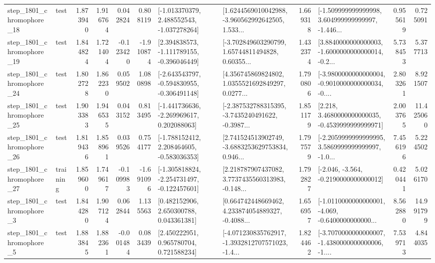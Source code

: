 \begin{tabular}{llrrrrllrlrr}
 step\_1801\_chromophore\_18 &      test &      1.873940 &    1.916764 &      0.042824 &  0.808119 &   [-1.013370379, 2.488552543, -1.037278264] &  [1.6244569010042988, -3.960562992642505, 1.533... &       1.669318 &  [-1.509999999999998, 3.604999999999997, -1.446... &            0.955619 &          0.725091 \\
 step\_1801\_chromophore\_19 &      test &      1.844824 &    1.721404 &     -0.123420 & -1.910874 &   [2.394838573, -1.111789155, -0.396046449] &  [-3.702849603290799, 1.65744811494828, 0.60355... &       1.432374 &  [3.8840000000000003, -1.6000000000000014, -0.2... &            5.738453 &          5.377713 \\
 step\_1801\_chromophore\_24 &      test &      1.802728 &    1.862230 &      0.059502 &  1.080898 &  [-2.643543797, -0.594830955, -0.306491148] &  [4.356745869824802, 1.0355521692849297, 0.0277... &       1.790806 &  [-3.9800000000000004, -0.9010000000000034, -0.... &            2.803261 &          8.921507 \\
 step\_1801\_chromophore\_25 &      test &      1.903383 &    1.946535 &      0.043152 &  0.813495 &   [-1.441736636, -2.269969617, 0.202088063] &  [-2.387532788315395, -3.7435240491622, -0.3987... &       1.851179 &   [2.218, 3.4680000000000035, -0.4539999999999971] &            2.003765 &         11.425060 \\
 step\_1801\_chromophore\_26 &      test &      1.819436 &    1.858961 &      0.039526 &  0.754177 &   [-1.788152412, 2.208464605, -0.583036353] &  [2.741524513902749, -3.6883253629753834, 0.946... &       1.797579 &  [-2.2059999999999995, 3.5869999999999997, -1.0... &            7.456196 &          5.224502 \\
 step\_1801\_chromophore\_27 &  training &      1.859600 &    1.749617 &     -0.109983 & -1.691096 &  [-1.305818824, -2.254731497, -0.122457601] &  [2.218787907437082, 3.7737435560313983, -0.148... &       1.792827 &              [-2.046, -3.564, -0.2190000000000012] &            0.420441 &          5.026170 \\
  step\_1801\_chromophore\_3 &      test &      1.844280 &    1.907124 &      0.062844 &  1.135563 &     [0.482152906, 2.650300788, 0.043361381] &  [0.664742448669462, 4.233874054889327, -0.4088... &       1.656957 &  [-1.0110000000000001, -4.069, -0.6400000000000... &            8.562880 &         14.991799 \\
  step\_1801\_chromophore\_5 &      test &      1.883845 &    1.882361 &     -0.001484 &  0.083439 &     [2.450222951, 0.965780704, 0.721588234] &  [-4.071230835762917, -1.3932812707571023, -1.4... &       1.824462 &  [-3.7070000000000007, -1.4380000000000006, -1.... &            7.539713 &          4.844035 \\

\end{tabular}
